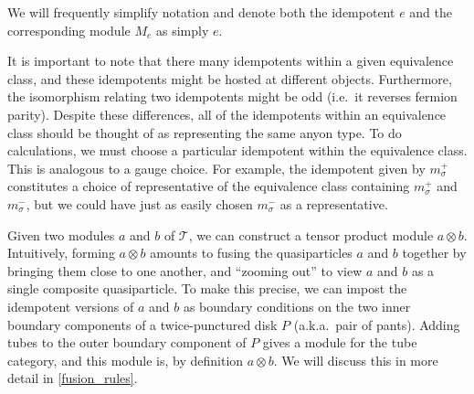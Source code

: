 \documentclass[12pt,a4paper]{article}
\newcommand{\tp}{\otimes}
\newcommand{\mct}{\mathcal{T}}
\begin{document}
We will frequently simplify notation and denote both the idempotent $e$ and the corresponding module $M_e$ as simply $e$.


It is important to note that there many idempotents within a given equivalence class,
and these idempotents might be hosted at different objects.
Furthermore, the isomorphism relating two idempotents might be odd
(i.e.\ it reverses fermion parity).
Despite these differences, all of the idempotents within an equivalence class should be thought of as representing the same
anyon type.
To do calculations, we must choose a particular idempotent within the equivalence class.
This is analogous to a gauge choice.
For example, the idempotent given by ${m_\sigma^+}$ constitutes a choice of representative of the equivalence 
class containing $m_\sigma^+$ and $m_\sigma^-$, but we could have just as easily chosen ${m_\sigma^-}$ as a representative.


Given two modules $a$ and $b$ of $\mct$, we can construct a tensor product module $a\tp b$.
Intuitively, forming $a\tp b$ amounts to fusing the quasiparticles $a$ and $b$ together by bringing them close 
to one another, and ``zooming out'' to view $a$ and $b$ as a single composite quasiparticle. 
To make this precise, we can impost the idempotent versions of $a$ and $b$ as boundary conditions on the two inner boundary components
of a twice-punctured disk $P$ (a.k.a.\ pair of pants).
Adding tubes to the outer boundary component of $P$ gives a module for the tube category, and this
module is, by definition $a\tp b$.
We will discuss this in more detail in \ref{fusion_rules}. 
\end{document}
